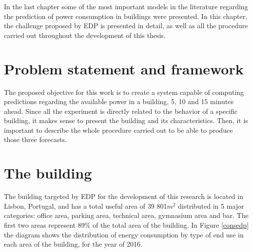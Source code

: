 \cleardoublepage
\label{chap:architecture}


In the last chapter some of the most important models in the literature regarding the prediction of power consumption in buildings were presented. In this chapter, the challenge proposed by \ac{EDP} is presented in detail, as well as all the procedure carried out throughout the development of this thesis.

\section{Problem statement and framework}\label{chap3:sec:problem_statement}

The proposed objective for this work is to create a system capable of computing predictions regarding the available power in a building, 5, 10 and 15 minutes ahead. Since all the experiment is directly related to the behavior of a specific building, it makes sense to present the building and its characteristics. Then, it is important to describe the whole procedure carried out to be able to produce those three forecasts.

\section{The building}\label{chap3:sec:building}

The building targeted by \ac{EDP} for the development of this research is located in Lisbon, Portugal, and has a total useful area of 39 801$m^2$ distributed in 5 major categories: office area, parking area, technical area, gymnasium area and bar. The first two areas represent 89\% of the total area of the building. In Figure \ref{consedp} the diagram shows the distribution of energy consumption by type of end use in each area of the building, for the year of 2016.

